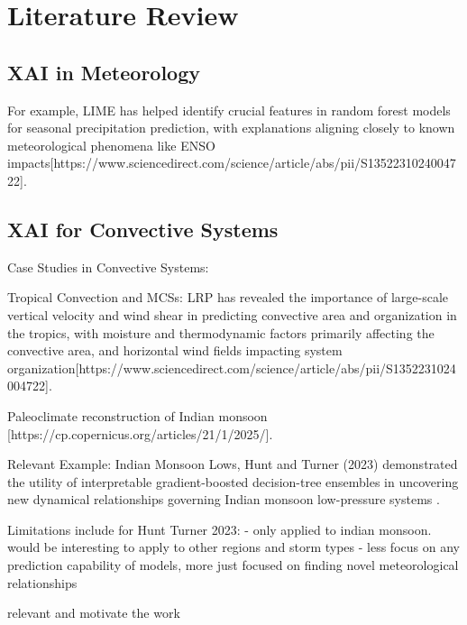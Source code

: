 
\section{Literature Review}

\subsection{XAI in Meteorology}


For example, LIME has helped identify crucial features in random forest models for seasonal precipitation prediction, with explanations aligning closely to known meteorological phenomena like ENSO impacts[https://www.sciencedirect.com/science/article/abs/pii/S1352231024004722].


\subsection{XAI for Convective Systems}

Case Studies in Convective Systems:

Tropical Convection and MCSs: LRP has revealed the importance of large-scale vertical velocity and wind shear in predicting convective area and organization in the tropics, with moisture and thermodynamic factors primarily affecting the convective area, and horizontal wind fields impacting system organization[https://www.sciencedirect.com/science/article/abs/pii/S1352231024004722].

Paleoclimate reconstruction of Indian monsoon [https://cp.copernicus.org/articles/21/1/2025/].

Relevant Example: Indian Monsoon Lows, Hunt and Turner (2023) demonstrated the utility of interpretable gradient-boosted decision-tree ensembles in uncovering new dynamical relationships governing Indian monsoon low-pressure systems \citep{Hunt2024}. 

Limitations include for Hunt Turner 2023: 
- only applied to indian monsoon. would be interesting to apply to other regions and storm types
- less focus on any prediction capability of models, more just focused on finding novel meteorological relationships

relevant and motivate the work
